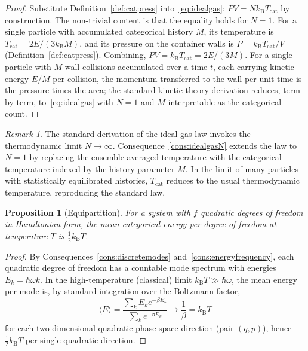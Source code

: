 \documentclass[11pt,twocolumn,a4paper]{article}
\theoremstyle{axiomstyle}
\theoremstyle{conseqstyle}
\newtheorem{proposition}{Proposition}
\theoremstyle{definition}
\theoremstyle{remark}
\newtheorem*{remark}{Remark}
\newcommand{\kB}{k_{\mathrm{B}}}
\begin{document}
\begin{proof}
Substitute Definition~\ref{def:catpress} into~\eqref{eq:idealgas}: $PV=N\kB T_{\mathrm{cat}}$ by construction. The non-trivial content is that the equality holds for $N=1$. For a single particle with accumulated categorical history $M$, its temperature is $T_{\mathrm{cat}}=2E/(3\kB M)$, and its pressure on the container walls is $P=\kB T_{\mathrm{cat}}/V$ (Definition~\ref{def:catpress}). Combining, $PV=\kB T_{\mathrm{cat}}=2E/(3M)$. For a single particle with $M$ wall collisions accumulated over a time $t$, each carrying kinetic energy $E/M$ per collision, the momentum transferred to the wall per unit time is the pressure times the area; the standard kinetic-theory derivation \citep{landaulifshitz5} reduces, term-by-term, to~\eqref{eq:idealgas} with $N=1$ and $M$ interpretable as the categorical count.
\end{proof}

\begin{remark}
The standard derivation of the ideal gas law invokes the thermodynamic limit $N\to\infty$. Consequence~\ref{cons:idealgasN} extends the law to $N=1$ by replacing the ensemble-averaged temperature with the categorical temperature indexed by the history parameter $M$. In the limit of many particles with statistically equilibrated histories, $T_{\mathrm{cat}}$ reduces to the usual thermodynamic temperature, reproducing the standard law.
\end{remark}

\begin{proposition}[Equipartition]
\label{prop:equipartition}
For a system with $f$ quadratic degrees of freedom in Hamiltonian form, the mean categorical energy per degree of freedom at temperature $T$ is $\tfrac{1}{2}\kB T$.
\end{proposition}

\begin{proof}
By Consequences~\ref{cons:discretemodes} and~\ref{cons:energyfrequency}, each quadratic degree of freedom has a countable mode spectrum with energies $E_{k}=\hbar\omega k$. In the high-temperature (classical) limit $\kB T\gg\hbar\omega$, the mean energy per mode is, by standard integration over the Boltzmann factor,
\begin{equation*}
\langle E\rangle=\frac{\sum_{k}E_{k}e^{-\beta E_{k}}}{\sum_{k}e^{-\beta E_{k}}}\to\frac{1}{\beta}=\kB T
\end{equation*}
for each two-dimensional quadratic phase-space direction (pair $(q,p)$), hence $\tfrac{1}{2}\kB T$ per single quadratic direction.
\end{proof}
\end{document}
